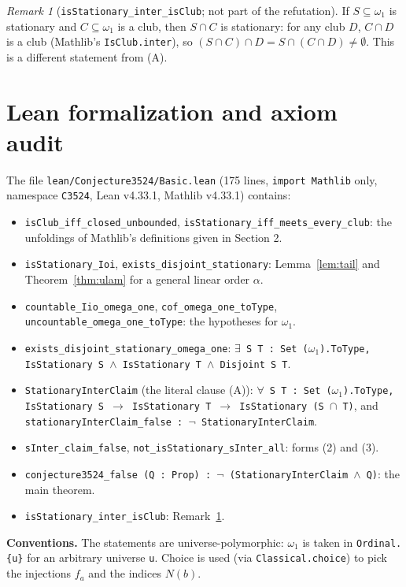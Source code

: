 \documentclass[11pt]{article}
\theoremstyle{definition}
\theoremstyle{remark}
\newtheorem{remark}[theorem]{Remark}
\begin{document}
\begin{remark}[\texttt{isStationary\_inter\_isClub}; not part of the refutation]\label{rem:club}
If $S\subseteq\omega_1$ is stationary and $C\subseteq\omega_1$ is a club, then $S\cap C$ is
stationary: for any club $D$, $C\cap D$ is a club (Mathlib's \texttt{IsClub.inter}), so
$(S\cap C)\cap D = S\cap(C\cap D)\ne\emptyset$. This is a different statement from (A).
\end{remark}

\section{Lean formalization and axiom audit}

The file \texttt{lean/Conjecture3524/Basic.lean} (175 lines, \texttt{import Mathlib} only,
namespace \texttt{C3524}, Lean v4.33.1, Mathlib v4.33.1) contains:
\begin{itemize}
\item \texttt{isClub\_iff\_closed\_unbounded}, \texttt{isStationary\_iff\_meets\_every\_club}:
  the unfoldings of Mathlib's definitions given in Section 2.
\item \texttt{isStationary\_Ioi}, \texttt{exists\_disjoint\_stationary}: Lemma~\ref{lem:tail} and
  Theorem~\ref{thm:ulam} for a general linear order $\alpha$.
\item \texttt{countable\_Iio\_omega\_one}, \texttt{cof\_omega\_one\_toType},
  \texttt{uncountable\_omega\_one\_toType}: the hypotheses for $\omega_1$.
\item \texttt{exists\_disjoint\_stationary\_omega\_one}:
  \texttt{$\exists$ S T : Set ($\omega_1$).ToType, IsStationary S $\wedge$ IsStationary T
  $\wedge$ Disjoint S T}.
\item \texttt{StationaryInterClaim} (the literal clause (A)):
  \texttt{$\forall$ S T : Set ($\omega_1$).ToType, IsStationary S $\to$ IsStationary T $\to$
  IsStationary (S $\cap$ T)}, and \texttt{stationaryInterClaim\_false :
  $\neg$ StationaryInterClaim}.
\item \texttt{sInter\_claim\_false}, \texttt{not\_isStationary\_sInter\_all}: forms (2) and (3).
\item \texttt{conjecture3524\_false (Q : Prop) : $\neg$ (StationaryInterClaim $\wedge$ Q)}:
  the main theorem.
\item \texttt{isStationary\_inter\_isClub}: Remark~\ref{rem:club}.
\end{itemize}

\textbf{Conventions.} The statements are universe-polymorphic: $\omega_1$ is taken in
\texttt{Ordinal.\{u\}} for an arbitrary universe \texttt{u}. Choice is used (via
\texttt{Classical.choice}) to pick the injections $f_a$ and the indices $N(b)$.
\end{document}

